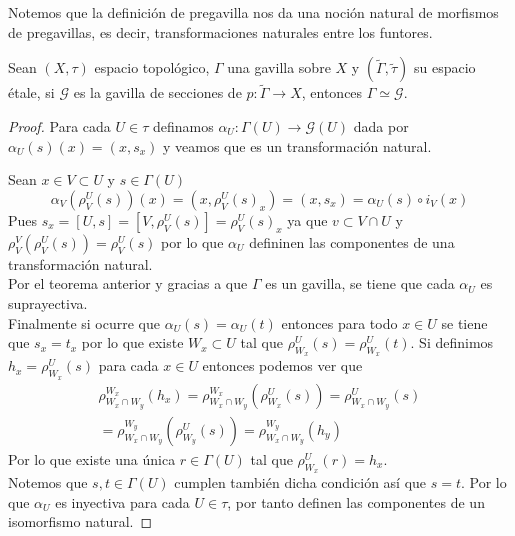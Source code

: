 \documentclass[14pt]{extarticle}
\begin{document}
Notemos que la definición de pregavilla
nos da una noción natural de morfismos de
pregavillas, es decir, transformaciones 
naturales entre los funtores.

\begin{teorema}{}{}
    Sean $(X,\tau)$ espacio topológico, 
    $\Gamma$ una gavilla sobre $X$ y 
    $(\widetilde{\Gamma},\tilde{\tau})$ su espacio étale,
    si $\mathcal{G}$ es la gavilla de secciones
    de $p:\widetilde{\Gamma}\rightarrow X$, entonces
    $\Gamma \simeq \mathcal{G}$.
\end{teorema}
\begin{proof}
    Para cada $U\in \tau$ definamos
    $\alpha_U:\Gamma(U)\rightarrow \mathcal{G}(U)$
    dada por $\alpha_U(s)(x)=(x,s_x)$ y veamos que 
    es un transformación natural.

    Sean $x\in V\subset U$ y $s\in \Gamma(U)$
    $$\alpha_V(\rho_{V}^{U}(s))(x)
    =(x, \rho_{V}^{U}(s)_x)
    =(x,s_x)=\alpha_U(s)\circ i_V (x)$$
    Pues $s_x=[U,s]=[V,\rho_{V}^{U}(s)]=\rho_{V}^{U}(s)_x$
    ya que $v\subset V\cap U$ y $\rho_{V}^{V}(\rho_{V}^{U}(s))=\rho_{V}^{U}(s)$
    por lo que $\alpha_U$ defininen las componentes de una transformación
    natural.\\
    Por el teorema anterior y gracias a que 
    $\Gamma$ es un gavilla, se tiene que cada 
    $\alpha_U$ es suprayectiva.\\
    Finalmente si ocurre que $\alpha_U(s)=\alpha_U(t)$
    entonces para todo $x\in U$ se tiene que $s_x=t_x$
    por lo que existe $W_x\subset U$ tal que $\rho_{W_x}^{U}(s)=\rho_{W_x}^{U}(t)$.
    Si definimos $h_x=\rho_{W_x}^{U}(s)$ para cada $x\in U$
    entonces podemos ver que 
    \begin{align*}
        \rho_{W_x\cap W_y}^{W_x}(h_x)
        =\rho_{W_x\cap W_y}^{W_x}(\rho_{W_x}^{U}(s))
        =\rho_{W_x\cap W_y}^{U}(s) \\
        =\rho_{W_x\cap W_y}^{W_y}(\rho_{W_y}^{U}(s))
        =\rho_{W_x\cap W_y}^{W_y}(h_y)
    \end{align*}
    Por lo que existe una única $r\in \Gamma(U)$
    tal que $\rho_{W_x}^{U}(r)=h_x$.\\
    Notemos que $s,t\in \Gamma(U)$ cumplen también
    dicha condición así que $s=t$.
    Por lo que $\alpha_U$ es inyectiva para cada $U\in \tau$,
    por tanto definen las componentes de un isomorfismo natural.
\end{proof}
\end{document}
